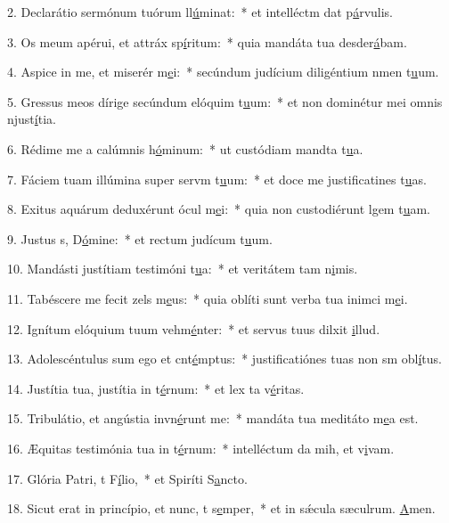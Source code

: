 2. Declarátio sermónum tuórum ll\uline{ú}minat:~* et intelléctm dat p\uline{á}rvulis.\par 
3. Os meum apérui, et attráx sp\uline{í}ritum:~* quia mandáta tua desder\uline{á}bam.\par 
4. Aspice in me, et miserér m\uline{e}i:~* secúndum judícium diligéntium nmen t\uline{u}um.\par 
5. Gressus meos dírige secúndum elóquim t\uline{u}um:~* et non dominétur mei omnis njust\uline{í}tia.\par 
6. Rédime me a calúmnis h\uline{ó}minum:~* ut custódiam mandta t\uline{u}a.\par 
7. Fáciem tuam illúmina super servm t\uline{u}um:~* et doce me justificatines t\uline{u}as.\par 
8. Exitus aquárum deduxérunt ócul m\uline{e}i:~* quia non custodiérunt lgem t\uline{u}am.\par 
9. Justus s, D\uline{ó}mine:~* et rectum judícum t\uline{u}um.\par 
10. Mandásti justítiam testimóni t\uline{u}a:~* et veritátem tam n\uline{i}mis.\par 
11. Tabéscere me fecit zels m\uline{e}us:~* quia oblíti sunt verba tua inimci m\uline{e}i.\par 
12. Ignítum elóquium tuum vehm\uline{é}nter:~* et servus tuus dilxit \uline{i}llud.\par 
13. Adolescéntulus sum ego et cnt\uline{é}mptus:~* justificatiónes tuas non sm obl\uline{í}tus.\par 
14. Justítia tua, justítia in t\uline{é}rnum:~* et lex ta v\uline{é}ritas.\par 
15. Tribulátio, et angústia invn\uline{é}runt me:~* mandáta tua meditáto m\uline{e}a est.\par 
16. Æquitas testimónia tua in t\uline{é}rnum:~* intelléctum da mih, et v\uline{i}vam.\par 
17. Glória Patri, t F\uline{í}lio,~* et Spiríti S\uline{a}ncto.\par 
18. Sicut erat in princípio, et nunc, t s\uline{e}mper,~* et in sǽcula sæculrum. \uline{A}men.\par 
